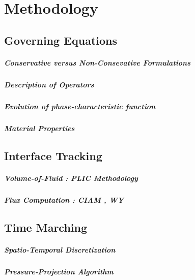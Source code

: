 \setchapterpreamble[u]{\margintoc}
\chapter{Methodology}


\section{Governing Equations}

\paragraph{Conservative versus Non-Consevative Formulations}
\blindtext

\paragraph{Description of Operators}
\blindtext

\paragraph{Evolution of phase-characteristic function}
\blindtext

\paragraph{Material Properties}
\blindtext


\section{Interface Tracking}

\paragraph{Volume-of-Fluid : PLIC Methodology}
\blindtext

\paragraph{Flux Computation : CIAM , WY}
\blindtext


\section{Time Marching}

\paragraph{Spatio-Temporal Discretization}
\blindtext

\paragraph{Pressure-Projection Algorithm}
\blindtext



